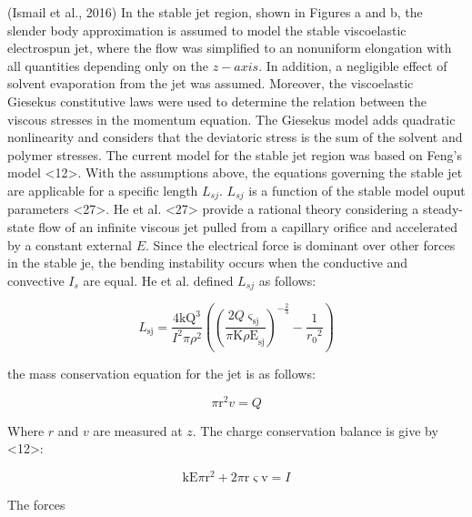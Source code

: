 (Ismail et al., 2016)
In the stable jet region, shown in Figures a and b, the slender body approximation is assumed to model the stable viscoelastic electrospun jet, where the flow was simplified to an nonuniform elongation with all quantities depending only on the $z-axis$. In addition, a negligible effect of solvent evaporation from the jet was assumed. Moreover, the viscoelastic Giesekus constitutive laws were used to determine the relation between the viscous stresses in the momentum equation. The Giesekus model adds quadratic nonlinearity and considers that the deviatoric stress is the sum of the solvent and polymer stresses. The current model for the stable jet region was based on Feng's model <12>. With the assumptions above, the equations governing the stable jet are applicable for a specific length $L_{sj}$. $L_{sj}$ is a function of the stable model ouput parameters <27>. He et al. <27> provide a rational theory considering a steady-state flow of an infinite viscous jet pulled from a capillary orifice and accelerated by a constant external $E$. Since the electrical force is dominant over other forces in the stable je, the bending instability occurs when the conductive and convective $I_{s}$ are equal. He et al. defined $L_{sj}$ as follows:

\begin{equation}
L_{\text{sj}}=\frac{4 \text{kQ}^3}{I^2 \pi \rho ^2}\left(\left(\frac{2 Q
   \varsigma_{\text{sj}}}{\text{$\pi $K$\rho
   $E}_{\text{sj}}}\right)^{-\frac{2}{3}}-\frac{1}{{r_{0}}^{2}}\right)
\label{eq:specificLength}
\end{equation}

the mass conservation equation for the jet is as follows:

\begin{equation}
\text{$\pi $r}^2 v=Q
\label{eq:massConservation}
\end{equation}

Where $r$ and $v$ are measured at $z$. The charge conservation balance is give by <12>:

\begin{equation}
\text{kE} \text{$\pi $r}^2+2 \text{$\pi $r$\varsigma$v}=I
\label{eq:chargeConservation}
\end{equation}

The forces



